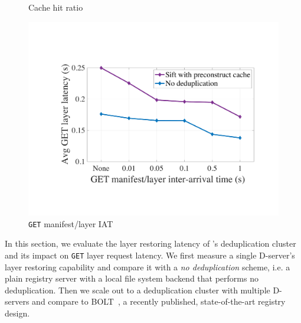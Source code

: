\begin{figure}[t]
\begin{minipage}{0.29\textwidth}
		\caption{Cache hit ratio}%
		\label{fig:eval-cachehitratios}
	\end{minipage}%
\hspace{1mm}
	\begin{minipage}{0.28\textwidth}
	\centering
	\includegraphics[width=\textwidth]{graphs/durationML.pdf}
	\caption{\texttt{GET} manifest/layer IAT}
	\label{fig:eval-durationML}
   \end{minipage}
\end{figure}

In this section, we evaluate the layer restoring latency of \sysname's deduplication cluster 
and its impact on \texttt{GET} layer request latency.
%
We first measure a single D-server's layer restoring capability and compare it with 
a \emph{no deduplication} scheme, i.e.  a plain registry server with a local file system backend
that performs no deduplication.
%
Then we scale out to a deduplication cluster with multiple D-servers and compare
\sysname to BOLT~\cite{littley2019bolt}, a recently published, state-of-the-art registry design.
%
%
%


